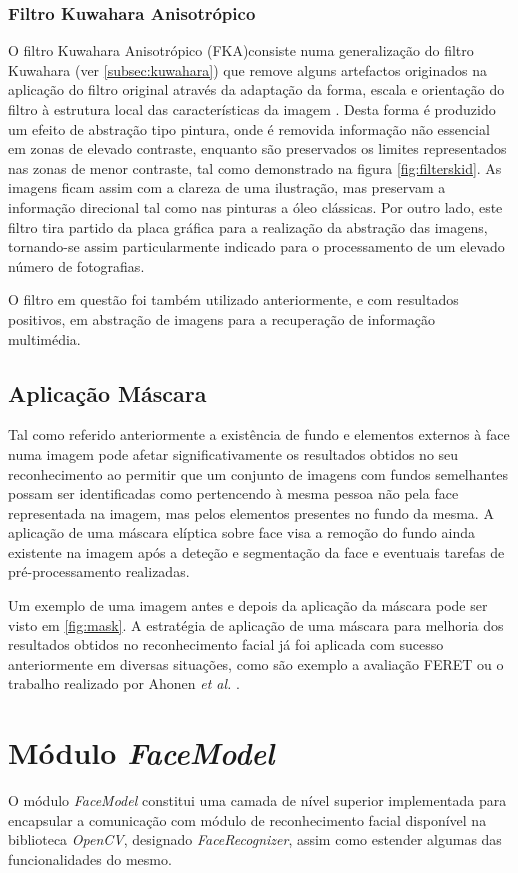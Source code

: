 \subsubsection*{Filtro Kuwahara Anisotrópico}
O filtro Kuwahara Anisotrópico (FKA)consiste numa generalização do filtro Kuwahara (ver \ref{subsec:kuwahara}) que remove alguns artefactos originados na aplicação do filtro original através da adaptação da forma, escala e orientação do filtro à estrutura local das características da imagem \cite{Kyprianidis2009}. Desta forma é produzido um efeito de abstração tipo pintura, onde é removida informação não essencial em zonas de elevado contraste, enquanto são preservados os limites representados nas zonas de menor contraste, tal como demonstrado na figura \ref{fig:filterskid}. As imagens ficam assim com a clareza de uma ilustração, mas preservam a informação direcional tal como nas pinturas a óleo clássicas. Por outro lado, este filtro tira partido da placa gráfica para a realização da abstração das imagens, tornando-se assim particularmente indicado para o processamento de um elevado número de fotografias.

O filtro em questão foi também utilizado anteriormente, e com resultados positivos, em abstração de imagens para a recuperação de informação multimédia. 

\subsection{Aplicação Máscara}
Tal como referido anteriormente a existência de fundo e elementos externos à face numa imagem pode afetar significativamente os resultados obtidos no seu reconhecimento ao permitir que um conjunto de imagens com fundos semelhantes possam ser identificadas como pertencendo à mesma pessoa não pela face representada na imagem, mas pelos elementos presentes no fundo da mesma. A aplicação de uma máscara elíptica sobre face visa a remoção do fundo ainda existente na imagem após a deteção e segmentação da face e eventuais tarefas de pré-processamento realizadas.

Um exemplo de uma imagem antes e depois da aplicação da máscara pode ser visto em \ref{fig:mask}. A estratégia de aplicação de uma máscara para melhoria dos resultados obtidos no reconhecimento facial já foi aplicada com sucesso anteriormente em diversas situações, como são exemplo a avaliação FERET \cite{Phillips2000} ou o trabalho realizado por Ahonen \textit{et al.} \cite{ahonen2004face}.

\section{Módulo \textit{FaceModel}} \label{sec:facemodel}
O módulo \textit{FaceModel} constitui uma camada de nível superior implementada para encapsular a comunicação com módulo de reconhecimento facial disponível na biblioteca \textit{OpenCV}, designado \textit{FaceRecognizer}, assim como estender algumas das funcionalidades do mesmo. 

